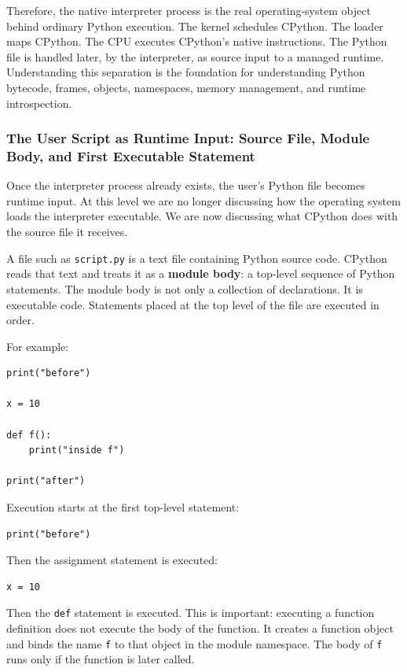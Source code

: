 Therefore, the native interpreter process is the real operating-system object behind ordinary Python execution. The kernel schedules CPython. The loader maps CPython. The CPU executes CPython's native instructions. The Python file is handled later, by the interpreter, as source input to a managed runtime. Understanding this separation is the foundation for understanding Python bytecode, frames, objects, namespaces, memory management, and runtime introspection.



\subsubsection{The User Script as Runtime Input: Source File, Module Body, and First Executable Statement}

Once the interpreter process already exists, the user's Python file becomes runtime input. At this level we are no longer discussing how the operating system loads the interpreter executable. We are now discussing what CPython does with the source file it receives.

A file such as \texttt{script.py} is a text file containing Python source code. CPython reads that text and treats it as a \textbf{module body}: a top-level sequence of Python statements. The module body is not only a collection of declarations. It is executable code. Statements placed at the top level of the file are executed in order.

For example:

\begin{verbatim}
print("before")

x = 10

def f():
    print("inside f")

print("after")
\end{verbatim}

Execution starts at the first top-level statement:

\begin{verbatim}
print("before")
\end{verbatim}

Then the assignment statement is executed:

\begin{verbatim}
x = 10
\end{verbatim}

Then the \texttt{def} statement is executed. This is important: executing a function definition does not execute the body of the function. It creates a function object and binds the name \texttt{f} to that object in the module namespace. The body of \texttt{f} runs only if the function is later called.

